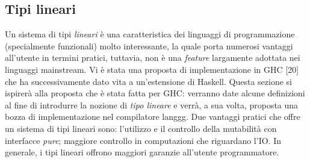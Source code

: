 \documentclass[10pt,a4paper]{article}
\begin{document}
\subsection{Tipi lineari}
Un sistema di tipi \textit{lineari} è una caratteristica dei linguaggi di programmazione (specialmente funzionali) molto
interessante, la quale porta numerosi vantaggi all'utente in termini pratici, tuttavia, non è una \textit{feature}
largamente adottata nei linguaggi mainstream. Vi è stata una proposta di implementazione in GHC [20] che ha
successivamente dato vita a un'estensione di Haskell. Questa sezione si ispirerà alla proposta che è stata fatta per GHC:
verranno date alcune definizioni al fine di introdurre la nozione di \textit{tipo lineare} e verrà, a sua volta, proposta una
bozza di implementazione nel compilatore langgg. Due vantaggi pratici che offre un sistema di tipi lineari sono: l'utilizzo
e il controllo della mutabilità con interfacce \textit{pure}; maggiore controllo in computazioni che riguardano l'IO.
In generale, i tipi lineari offrono maggiori garanzie all'utente programmatore.
\end{document}

